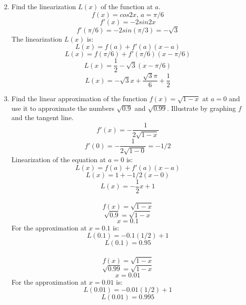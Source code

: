 \documentclass[12pt]{article}
\begin{document}
\begin{enumerate}
    \setcounter{enumi}{1}
    \item Find the linearization $L(x)$ of the function at $a$.
    \[f(x) = cos2x \text{, } a = \pi/6\]
    \[f'(x) = -2sin2x \]
    \[f'(\pi/6) = -2 sin(\pi/3) = -\sqrt{3}\]
    The linearization $L(x)$ is:
    \[L(x) = f(a) + f'(a)(x - a)\]
    \[L(x) = f(\pi/6) + f'(\pi/6)(x - \pi/6)\]
    \[L(x) = \frac{1}{2} - \sqrt{3}(x - \pi/6)\]
    \[\boxed{L(x) = - \sqrt{3}x + \frac{\sqrt{3}\pi}{6} + \frac{1}{2}}\]
    \setcounter{enumi}{4}
    \item Find the linear approximation of the function $f(x) = \sqrt{1 - x}$ at $a = 0$ and use it to approximate the numbers $\sqrt{0.9}$ and $\sqrt{0.99}$. Illustrate by graphing $f$ and the tangent line.
    \[f'(x) = -\frac{1}{2\sqrt{1 - x}}\]
    \[f'(0) = -\frac{1}{2\sqrt{1 - 0}} = -1/2\]
    Linearization of the equation at $a = 0$ is:
    \[L(x) = f(a) + f'(a)(x - a)\]
    \[L(x) = 1 + -1/2(x - 0)\]
    \[L(x) = -\frac{1}{2}x + 1\]
    \\
    \[f(x) = \sqrt{1 - x}\]
    \[\sqrt{0.9} = \sqrt{1 - x}\]
    \[x = 0.1\]
    For the approximation at $x = 0.1$ is:
    \[L(0.1) = -0.1(1/2) + 1\]
    \[\boxed{L(0.1) = 0.95}\]
    \\
    \[f(x) = \sqrt{1 - x}\]
    \[\sqrt{0.99} = \sqrt{1 - x}\]
    \[x = 0.01\]
    For the approximation at $x = 0.01$ is:
    \[L(0.01) = -0.01(1/2) + 1\]
    \[\boxed{L(0.01) = 0.995}\]
    \newpage
    \begin{figure}[!h]
        \begin{framed}
            \centering
        \end{framed}
    \end{figure}


\end{enumerate}
\end{document}
